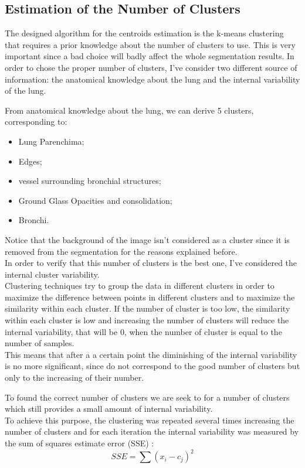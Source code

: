 \documentclass{standalone}
\begin{document}
	\subsection{Estimation of the Number of Clusters}
	
	The designed algorithm for the centroids estimation is the k-means clustering that requires a prior knowledge about the number of clusters to use. This is very important since a bad choice will badly affect the whole segmentation results. In order to chose the proper number of clusters, I've consider two different source of information: the anatomical knowledge about the lung and the internal variability of the lung.
	
	From anatomical knowledge about the lung, we can derive 5 clusters, corresponding to: 
	
	\begin{itemize}
		\item Lung Parenchima; 
		
		\item  Edges;
		
		\item vessel surrounding bronchial structures;
		
		\item  Ground Glass Opacities and consolidation;
		
		\item Bronchi.
	\end{itemize}

	Notice that the background of the image isn't considered as a cluster since it is removed from the segmentation for the reasons explained before.\\
	In order to verify that this number of clusters is the best one, I've considered the internal cluster variability.\\
	Clustering techniques try to group the data in different clusters  in order to maximize the difference between points in different clusters and to maximize the similarity within each cluster.  If the number of cluster is too low, the similarity within each cluster is low and increasing the number of clusters will reduce the internal variability, that will be $0$, when the number of cluster is equal to the number of samples.\\ This means that after a a certain point the diminishing of the internal variability is no more significant, since do not correspond to the good number of clusters but only to the increasing of their number.
	
	To found the correct number of clusters we are seek to for a number of clusters which still provides a small amount of internal variability. \\
	To achieve this purpose, the clustering was repeated several times increasing the number of clusters and for each iteration the internal variability was measured by the sum of squares estimate error (SSE) : 
	\begin{equation}\label{eq:SumOfSquare}
		SSE = \sum (x_i - c_j)^2
	\end{equation}
	
\end{document}
